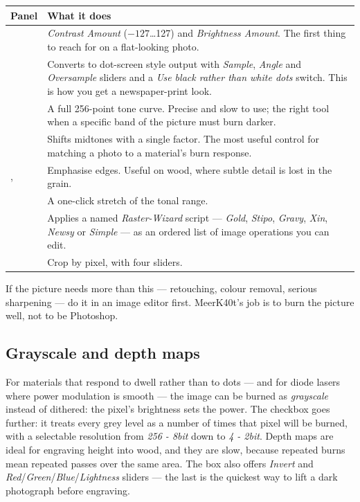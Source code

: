 \begin{center}\small
\begin{tabular}{@{}L{3.0cm}L{11.2cm}@{}}
\toprule
\textbf{Panel} & \textbf{What it does} \\
\midrule
{} & \emph{Contrast Amount} ($-127$\dots127) and \emph{Brightness
Amount}. The first thing to reach for on a flat-looking photo. \\
 & Converts to dot-screen style output with \emph{Sample},
\emph{Angle} and \emph{Oversample} sliders and a \emph{Use black rather than
white dots} switch. This is how you get a newspaper-print look. \\
 & A full 256-point tone curve. Precise and slow to use; the right tool
when a specific band of the picture must burn darker. \\
 & Shifts midtones with a single factor. The most useful control for
matching a photo to a material's burn response. \\
,  & Emphasise edges. Useful on wood, where
subtle detail is lost in the grain. \\
 & A one-click stretch of the tonal range. \\
 & Applies a named \emph{Raster-Wizard} script ---
\emph{Gold}, \emph{Stipo}, \emph{Gravy}, \emph{Xin}, \emph{Newsy} or
\emph{Simple} --- as an ordered list of image operations you can edit. \\
 & Crop by pixel, with four sliders. \\
\bottomrule
\end{tabular}
\end{center}

\noindent If the picture needs more than this --- retouching, colour removal,
serious sharpening --- do it in an image editor first. MeerK40t's job is to burn
the picture well, not to be Photoshop.

\subsection*{Grayscale and depth maps}

For materials that respond to dwell rather than to dots --- and for diode lasers
where power modulation is smooth --- the image can be burned as \emph{grayscale}
instead of dithered: the pixel's brightness sets the power. The
 checkbox goes further: it treats every grey level as a number of
times that pixel will be burned, with a selectable resolution from \emph{256 -
8bit} down to \emph{4 - 2bit}. Depth maps are ideal for engraving height into
wood, and they are slow, because repeated burns mean repeated passes over the
same area. The  box also offers \emph{Invert} and
\emph{Red}/\emph{Green}/\emph{Blue}/\emph{Lightness} sliders --- the last is the
quickest way to lift a dark photograph before engraving.

